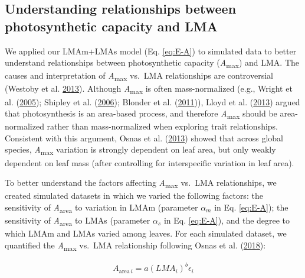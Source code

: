 \documentclass[
  12pt,
]{article}
\begin{document}
\hypertarget{understanding-relationships-between-photosynthetic-capacity-and-lma}{%
\subsection{Understanding relationships between photosynthetic capacity and LMA}\label{understanding-relationships-between-photosynthetic-capacity-and-lma}}

We applied our LMAm+LMAs model (Eq. \eqref{eq:E-A}) to simulated data to better understand relationships between photosynthetic capacity (\emph{A}\textsubscript{max}) and LMA.
The causes and interpretation of \emph{A}\textsubscript{max} vs.~LMA relationships are controversial (Westoby et al. \protect\hyperlink{ref-Westoby2013}{2013}).
Although \emph{A}\textsubscript{max} is often mass-normalized (e.g., Wright et al. (\protect\hyperlink{ref-Wright2005}{2005}); Shipley et al. (\protect\hyperlink{ref-Shipley2006}{2006}); Blonder et al. (\protect\hyperlink{ref-Blonder2011}{2011})), Lloyd et al. (\protect\hyperlink{ref-Lloyd2013}{2013}) argued that photosynthesis is an area-based process, and therefore \emph{A}\textsubscript{max} should be area-normalized rather than mass-normalized when exploring trait relationships.
Consistent with this argument, Osnas et al. (\protect\hyperlink{ref-Osnas2013}{2013}) showed that across global species, \emph{A}\textsubscript{max} variation is strongly dependent on leaf area, but only weakly dependent on leaf mass (after controlling for interspecific variation in leaf area).

To better understand the factors affecting \emph{A}\textsubscript{max} vs.~LMA relationships, we created simulated datasets in which we varied the following factors: the sensitivity of \emph{A}\textsubscript{area} to variation in LMAm (parameter \(\alpha_m\) in Eq. \eqref{eq:E-A}); the sensitivity of \emph{A}\textsubscript{area} to LMAs (parameter \(\alpha_s\) in Eq. \eqref{eq:E-A}), and the degree to which LMAm and LMAs varied among leaves.
For each simulated dataset, we quantified the \emph{A}\textsubscript{max} vs.~LMA relationship following Osnas et al. (\protect\hyperlink{ref-Osnas2018}{2018}):

\begin{align}
A_{\mathrm{area} \, i} = a (LMA_i)^{b}\epsilon_i \label{eq:mass}
\end{align}
\end{document}
